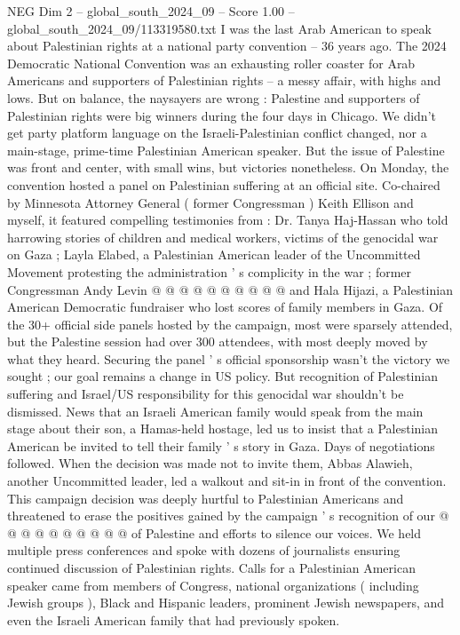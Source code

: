 \begin{textsample}{NEG Dim 2 – global\_south\_2024\_09 – Score 1.00 – global\_south\_2024\_09/113319580.txt}  \label{ex:f2_neg_406}
I was the last Arab American to speak about Palestinian rights at a national party convention -- 36 years ago.
The 2024 Democratic National Convention was an exhausting roller coaster for Arab Americans and supporters of Palestinian rights -- a messy affair, with highs and lows.
But on balance, the naysayers are wrong : Palestine and supporters of Palestinian rights were big winners during the four days in Chicago.
We didn't get party platform language on the Israeli-Palestinian conflict changed, nor a main-stage, prime-time Palestinian American speaker.
But the issue of Palestine was front and center, with small wins, but victories nonetheless.
On Monday, the convention hosted a panel on Palestinian suffering at an official site.
Co-chaired by Minnesota Attorney General ( former Congressman ) Keith Ellison and myself, it featured compelling testimonies from : Dr.
Tanya Haj-Hassan who told harrowing stories of children and medical workers, victims of the genocidal war on Gaza ; Layla Elabed, a Palestinian American leader of the Uncommitted Movement protesting the administration ' s complicity in the war ; former Congressman Andy Levin @ @ @ @ @ @ @ @ @ @ and Hala Hijazi, a Palestinian American Democratic fundraiser who lost scores of family members in Gaza.
Of the 30+ official side panels hosted by the campaign, most were sparsely attended, but the Palestine session had over 300 attendees, with most deeply moved by what they heard.
Securing the panel ' s official sponsorship wasn't the victory we sought ; our goal remains a change in US policy.
But recognition of Palestinian suffering and Israel/US responsibility for this genocidal war shouldn't be dismissed.
News that an Israeli American family would speak from the main stage about their son, a Hamas-held hostage, led us to insist that a Palestinian American be invited to tell their family ' s story in Gaza.
Days of negotiations followed.
When the decision was made not to invite them, Abbas Alawieh, another Uncommitted leader, led a walkout and sit-in in front of the convention.
This campaign decision was deeply hurtful to Palestinian Americans and threatened to erase the positives gained by the campaign ' s recognition of our @ @ @ @ @ @ @ @ @ @ of Palestine and efforts to silence our voices.
We held multiple press conferences and spoke with dozens of journalists ensuring continued discussion of Palestinian rights.
Calls for a Palestinian American speaker came from members of Congress, national organizations ( including Jewish groups ), Black and Hispanic leaders, prominent Jewish newspapers, and even the Israeli American family that had previously spoken.

\end{textsample}
